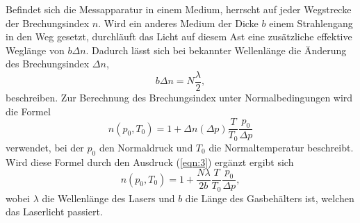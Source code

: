 Befindet sich die Messapparatur in einem Medium, herrscht auf jeder Wegstrecke der Brechungsindex $n$.
Wird ein anderes Medium der Dicke $b$ einem Strahlengang in den Weg gesetzt, durchläuft das Licht auf diesem Ast eine zusätzliche effektive Weglänge von $b\Delta n$.
Dadurch lässt sich bei bekannter Wellenlänge die Änderung des Brechungsindex $\Delta n$,
\begin{equation}
  b\Delta n = N\frac{\lambda}{2}, \label{eqn:3}
\end{equation}
beschreiben.
Zur Berechnung des Brechungsindex unter Normalbedingungen wird die Formel
\begin{equation}
  n(p_0,T_0) = 1 +\Delta n(\Delta p) \frac{T}{T_0}\frac{p_0}{\Delta p}
\end{equation}
verwendet, bei der $p_0$ den Normaldruck und $T_0$ die Normaltemperatur beschreibt.
Wird diese Formel durch den Ausdruck (\ref{eqn:3}) ergänzt ergibt sich
\begin{equation}
  n(p_0,T_0) = 1 +\frac{N \lambda}{2b} \frac{T}{T_0}\frac{p_0}{\Delta p}, \label{eqn:soso}
\end{equation}
wobei $\lambda$ die Wellenlänge des Lasers und $b$ die Länge des Gasbehälters ist, welchen das Laserlicht passiert.





